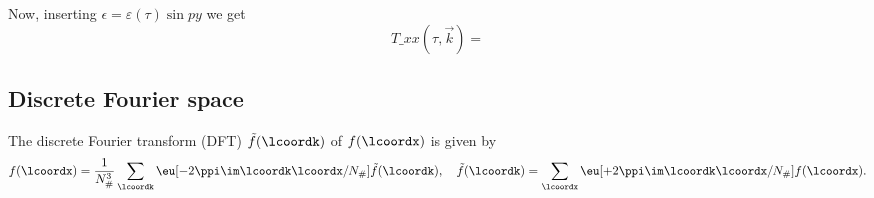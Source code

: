     \begin{draft}
        
    


        Now, inserting $\epsilon = \varepsilon(\tau) \sin{py}$ we get
        \begin{equation}
            T\_{xx}(\tau, \vec{k}) = 
        \end{equation}


    
    




\subsection{Discrete Fourier space}
    The discrete Fourier transform (DFT) $\tilde{f}(\lcoordk)$ of $f(\lcoordx)$ is given by
    \begin{equation}
        f(\lcoordx) = \frac{1}{N_\#^3} \sum_{\lcoordk } \eu[-2\ppi \im \lcoordk \lcoordx/N_\# ]\tilde{f}(\lcoordk) , \quad \tilde{f}(\lcoordk) = \sum_{\lcoordx} \eu[+2\ppi \im \lcoordk \lcoordx/N_\#  ]f(\lcoordx).
    \end{equation}





\end{draft}
